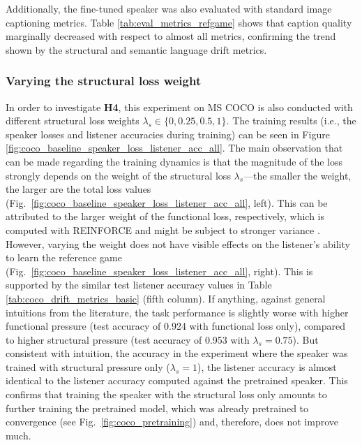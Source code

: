 
Additionally, the fine-tuned speaker was also evaluated with standard image captioning metrics. Table \ref{tab:eval_metrics_refgame} shows that caption quality marginally decreased with respect to almost all metrics, confirming the trend shown by the structural and semantic language drift metrics.

\subsubsection{Varying the structural loss weight}
In order to investigate \textbf{H4}, this experiment on MS COCO is also conducted with different structural loss weights $\lambda_s \in \{0, 0.25, 0.5, 1\}$. The training results (i.e., the speaker losses and listener accuracies during training) can be seen in Figure \ref{fig:coco_baseline_speaker_loss_listener_acc_all}. The main observation that can be made regarding the training dynamics is that the magnitude of the loss strongly depends on the weight of the structural loss $\lambda_s$---the smaller the weight, the larger are the total loss values (Fig.~\ref{fig:coco_baseline_speaker_loss_listener_acc_all}, left). This can be attributed to the larger weight of the functional loss, respectively, which is computed with REINFORCE and might be subject to stronger variance \parencite[cf.][]{havrylov2017emergence}. However, varying the weight does not have visible effects on the listener's ability to learn the reference game (Fig.~\ref{fig:coco_baseline_speaker_loss_listener_acc_all}, right). 
This is supported by the similar test listener accuracy values in Table \ref{tab:coco_drift_metrics_basic} (fifth column). If anything, against general intuitions from the literature, the task performance is slightly worse with higher functional pressure (test accuracy of 0.924 with functional loss only), compared to higher structural pressure (test accuracy of 0.953 with $\lambda_s = 0.75$). But consistent with intuition, the accuracy in the experiment where the speaker was trained with structural pressure only ($\lambda_s = 1$), the listener accuracy is almost identical to the listener accuracy computed against the pretrained speaker. This confirms that training the speaker with the structural loss only amounts to further training the pretrained model, which was already pretrained to convergence (see Fig.~\ref{fig:coco_pretraining}) and, therefore, does not improve much.

